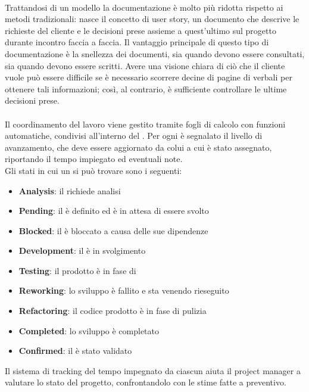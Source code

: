    \paragraph*{}
   Trattandosi di un modello  la documentazione è molto più ridotta rispetto ai metodi tradizionali: nasce il concetto di user story, un documento che descrive le richieste del cliente e le decisioni prese assieme a quest'ultimo sul progetto durante incontro faccia a faccia. Il vantaggio principale di questo tipo di documentazione è la snellezza dei documenti, sia quando devono essere consultati, sia quando devono essere scritti. Avere una visione chiara di ciò che il cliente vuole può essere difficile se è necessario scorrere decine di pagine di verbali per ottenere tali informazioni; così, al contrario, è sufficiente controllare le ultime decisioni prese.
   \paragraph*{}
   Il coordinamento del lavoro viene gestito tramite fogli di calcolo con funzioni automatiche, condivisi all'interno del . Per ogni  è segnalato il livello di avanzamento, che deve essere aggiornato da colui a cui è stato assegnato, riportando il tempo impiegato ed eventuali note.
   \\
   Gli stati in cui un  si può trovare sono i seguenti:
   \begin{itemize}
      \item{\textbf{Analysis}: il  richiede analisi}
      \item{\textbf{Pending}: il  è definito ed è in attesa di essere svolto}
      \item{\textbf{Blocked}: il  è bloccato a causa delle sue dipendenze}
      \item{\textbf{Development}: il  è in svolgimento}
      \item{\textbf{Testing}: il prodotto è in fase di }
      \item{\textbf{Reworking}: lo sviluppo è fallito e sta venendo rieseguito}
      \item{\textbf{Refactoring}: il codice prodotto è in fase di pulizia}
      \item{\textbf{Completed}: lo sviluppo è completato}
      \item{\textbf{Confirmed}: il  è stato validato}
   \end{itemize}
   Il sistema di tracking del tempo impegnato da ciascun  aiuta il project manager a valutare lo stato del progetto, confrontandolo con le stime fatte a preventivo.

